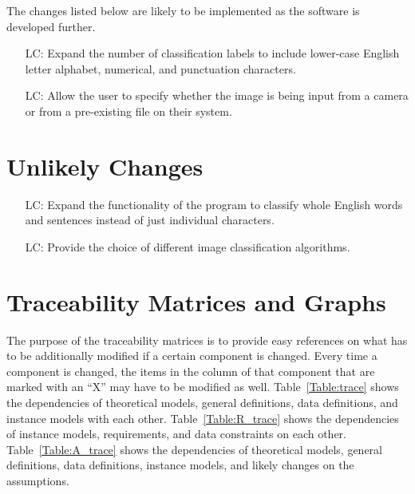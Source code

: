 \documentclass[12pt]{article}
\newcounter{lcnum} %
\begin{document}
The changes listed below are likely to be implemented as the software is developed further.

\noindent \begin{itemize}

\item[LC\refstepcounter{lcnum}\thelcnum\label{LC1}:] Expand the number of classification labels
to include lower-case English letter alphabet, numerical, and punctuation characters. 
\item[LC\refstepcounter{lcnum}\thelcnum\label{LC2}:] Allow the user to specify whether the image is being
input from a camera or from a pre-existing file on their system.

\end{itemize}

\section{Unlikely Changes}    

\noindent \begin{itemize}

\item[LC\refstepcounter{lcnum}\thelcnum\label{LC3}:] Expand the functionality of the program to classify
whole English words and sentences instead of just individual characters.
\item[LC\refstepcounter{lcnum}\thelcnum\label{LC4}:] Provide the choice of different image classification algorithms.


\end{itemize}

\section{Traceability Matrices and Graphs}

The purpose of the traceability matrices is to provide easy references on what
has to be additionally modified if a certain component is changed.  Every time a
component is changed, the items in the column of that component that are marked
with an ``X'' may have to be modified as well.  Table~\ref{Table:trace} shows the
dependencies of theoretical models, general definitions, data definitions, and
instance models with each other. Table~\ref{Table:R_trace} shows the
dependencies of instance models, requirements, and data constraints on each
other. Table~\ref{Table:A_trace} shows the dependencies of theoretical models,
general definitions, data definitions, instance models, and likely changes on
the assumptions.
\end{document}

